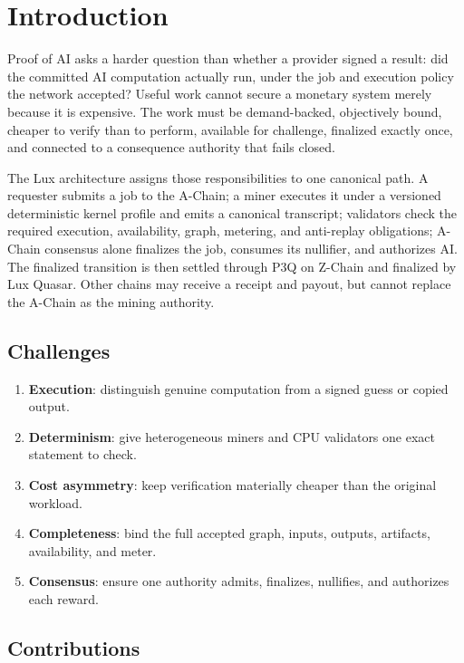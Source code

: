 \section{Introduction}

Proof of AI asks a harder question than whether a provider signed a result: did the
committed AI computation actually run, under the job and execution policy the network
accepted? Useful work cannot secure a monetary system merely because it is expensive.
The work must be demand-backed, objectively bound, cheaper to verify than to perform,
available for challenge, finalized exactly once, and connected to a consequence authority
that fails closed.

The Lux architecture assigns those responsibilities to one canonical path. A requester
submits a job to the A-Chain; a miner executes it under a versioned deterministic kernel
profile and emits a canonical transcript; validators check the required execution,
availability, graph, metering, and anti-replay obligations; A-Chain consensus alone
finalizes the job, consumes its nullifier, and authorizes \textsc{AI}. The finalized
transition is then settled through P3Q on Z-Chain and finalized by Lux Quasar. Other chains
may receive a receipt and payout, but cannot replace the A-Chain as the mining authority.

\subsection{Challenges}

\begin{enumerate}
  \item \textbf{Execution}: distinguish genuine computation from a signed guess or copied output.
  \item \textbf{Determinism}: give heterogeneous miners and CPU validators one exact statement to check.
  \item \textbf{Cost asymmetry}: keep verification materially cheaper than the original workload.
  \item \textbf{Completeness}: bind the full accepted graph, inputs, outputs, artifacts, availability, and meter.
  \item \textbf{Consensus}: ensure one authority admits, finalizes, nullifies, and authorizes each reward.
\end{enumerate}

\subsection{Contributions}

